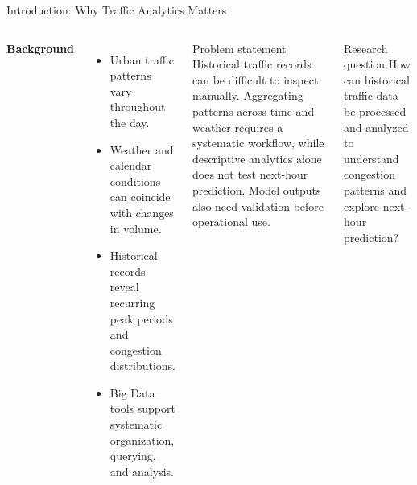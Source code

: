 \documentclass[aspectratio=169,11pt]{beamer}
\begin{document}
\begin{frame}{Introduction: Why Traffic Analytics Matters}
\begin{columns}[T,onlytextwidth]
\textbf{Background}
\begin{itemize}
\item Urban traffic patterns vary throughout the day.
\item Weather and calendar conditions can coincide with changes in volume.
\item Historical records reveal recurring peak periods and congestion distributions.
\item Big Data tools support systematic organization, querying, and analysis.
\end{itemize}
\begin{block}{Problem statement}
Historical traffic records can be difficult to inspect manually. Aggregating patterns across time and weather requires a systematic workflow, while descriptive analytics alone does not test next-hour prediction. Model outputs also need validation before operational use.
\end{block}
\begin{alertblock}{Research question}
How can historical traffic data be processed and analyzed to understand congestion patterns and explore next-hour prediction?
\end{alertblock}
\end{columns}
\end{frame}
\end{document}
